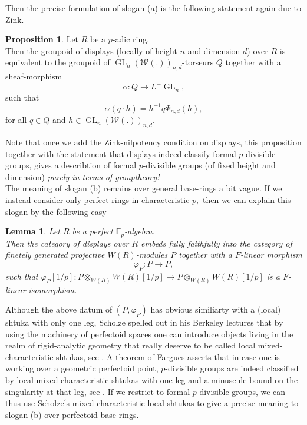 \documentclass[a4paper,10,5 pt]{amsart}
\newtheorem{Lemma}[Satz]{Lemma}
\theoremstyle{definition}
\newtheorem{proposition}[Satz]{Proposition}
\DeclareMathOperator{\GL}{GL}
\begin{document}
Then the precise formulation of slogan (a) is the following statement again due to Zink.
\begin{proposition}\label{Displays sind lokal Konjugationsklassen von Matrizen}
Let $R$ be a $p$-adic ring.
\\
Then the groupoid of displays (locally of height $n$ and dimension $d$) over $R$ is equivalent to the groupoid of $\GL_{n}(\mathcal{W}(.))_{n,d}$-torseurs $Q$ together with a sheaf-morphism
$$
\alpha\colon Q\rightarrow L^{+}\GL_{n},
$$
such that
\begin{equation}
\alpha(q\cdot h)=h^{-1}q\Phi_{n,d}(h),
\end{equation}
for all $q\in Q$ and $h\in \GL_{n}(\mathcal{W}(.))_{n,d}.$
\end{proposition}
Note that once we add the Zink-nilpotency condition on displays, this proposition together with the statement that displays indeed classify formal $p$-divisible groups, gives a describtion of formal $p$-divisible groups (of fixed height and dimension) \textit{purely in terms of grouptheory!}
\\
The meaning of slogan (b) remains over general base-rings a bit vague. If we instead consider only perfect rings in characteristic $p,$ then we can explain this slogan by the following easy
\begin{Lemma}
Let $R$ be a perfect $\mathbb{F}_{p}$-algebra.
\\
Then the category of displays over $R$ embeds fully faithfully into the category of finetely generated projective $W(R)$-modules $P$ together with a $F$-linear morphism
$$
\varphi_{P}\colon P\rightarrow P,
$$
such that $\varphi_{P}[1/p]\colon P\otimes_{W(R)} W(R)[1/p]\rightarrow P\otimes_{W(R)} W(R)[1/p]$ is a $F$-linear isomorphism.
\end{Lemma}
Although the above datum of $(P,\varphi_{P})$ has obvious similiarty with a (local) shtuka with only one leg, Scholze spelled out in his Berkeley lectures \cite{Berkeley lecturs} that by using the machinery of perfectoid spaces one can introduce objects living in the realm of rigid-analytic geometry that really deserve to be called local mixed-characteristic shtukas, see \cite[Def. 11.4.1.]{Berkeley lectures}. A theorem of Fargues asserts that in case one is working over a geometric perfectoid point, $p$-divisible groups are indeed classified by local mixed-characteristic shtukas with one leg and a minuscule bound on the singularity at that leg, see \cite[Thm. 14.1.1.]{Berkeley lectures}. If we restrict to formal $p$-divisible groups, we can thus use Scholze$^{\prime}$s mixed-characteristic local shtukas to give a precise meaning to slogan (b) over perfectoid base rings.
\end{document}
